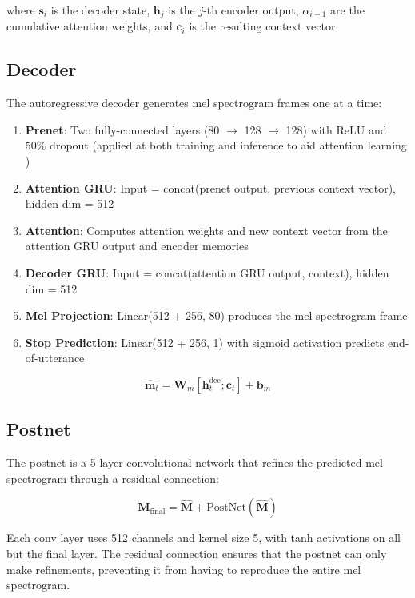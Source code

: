 \documentclass[conference]{IEEEtran}
\begin{document}
where $\mathbf{s}_i$ is the decoder state, $\mathbf{h}_j$ is the $j$-th encoder output, $\alpha_{i-1}$ are the cumulative attention weights, and $\mathbf{c}_i$ is the resulting context vector.

\subsection{Decoder}

The autoregressive decoder generates mel spectrogram frames one at a time:

\begin{enumerate}
\item \textbf{Prenet}: Two fully-connected layers (80 $\rightarrow$ 128 $\rightarrow$ 128) with ReLU and 50\% dropout (applied at both training and inference to aid attention learning \cite{shen2018tacotron2})
\item \textbf{Attention GRU}: Input = concat(prenet output, previous context vector), hidden dim = 512
\item \textbf{Attention}: Computes attention weights and new context vector from the attention GRU output and encoder memories
\item \textbf{Decoder GRU}: Input = concat(attention GRU output, context), hidden dim = 512
\item \textbf{Mel Projection}: Linear(512 + 256, 80) produces the mel spectrogram frame
\item \textbf{Stop Prediction}: Linear(512 + 256, 1) with sigmoid activation predicts end-of-utterance
\end{enumerate}

\begin{equation}
\hat{\mathbf{m}}_t = \mathbf{W}_m [\mathbf{h}_t^{\text{dec}}; \mathbf{c}_t] + \mathbf{b}_m
\end{equation}

\subsection{Postnet}

The postnet is a 5-layer convolutional network that refines the predicted mel spectrogram through a residual connection:

\begin{equation}
\mathbf{M}_{\text{final}} = \hat{\mathbf{M}} + \text{PostNet}(\hat{\mathbf{M}})
\end{equation}

Each conv layer uses 512 channels and kernel size 5, with tanh activations on all but the final layer. The residual connection ensures that the postnet can only make refinements, preventing it from having to reproduce the entire mel spectrogram.
\end{document}
